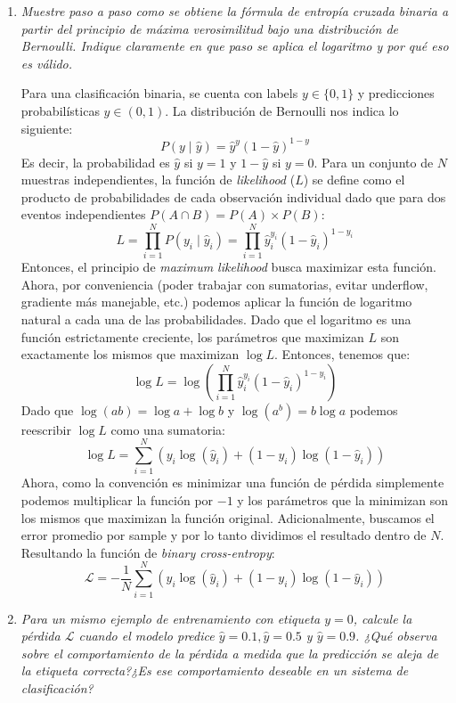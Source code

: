 \documentclass[11pt]{article}
\begin{document}
\begin{enumerate}[label=\alph*.]
  \item \textit{Muestre paso a paso como se obtiene la fórmula de entropía cruzada binaria a partir del principio de máxima verosimilitud bajo una distribución
    de Bernoulli. Indique claramente en que paso se aplica el logaritmo y por qué eso es válido.}

    Para una clasificación binaria, se cuenta con labels $y \in \{0,1\}$ y predicciones probabilísticas $\hat{y} \in (0,1)$. La distribución
    de Bernoulli nos indica lo siguiente:
    \[
      P(y \mid \hat{y}) = \hat{y}^{y} (1-\hat{y})^{1-y}
    \]
    Es decir, la probabilidad es $\hat{y}$ si $y = 1$ y $1 - \hat{y}$ si $y = 0$. Para un conjunto de $N$ muestras independientes, la función 
    de \textit{likelihood} ($L$) se define como el producto de probabilidades de cada observación individual dado que para dos eventos independientes
    $P(A \cap B) = P(A) \times P(B)$:
    \[
      L = \prod_{i=1}^{N} P(y_i \mid \hat{y}_i) = \prod_{i=1}^{N} \hat{y}_i^{y_i} (1 - \hat{y}_i)^{1 - y_i}
    \]
    Entonces, el principio de \textit{maximum likelihood} busca maximizar esta función. Ahora, por conveniencia (poder trabajar con sumatorias, evitar
    underflow, gradiente más manejable, etc.) podemos aplicar la función de logaritmo natural a cada una de las probabilidades. Dado que el logaritmo
    es una función estrictamente creciente, los parámetros que maximizan $L$ son exactamente los mismos que maximizan $\log L$. Entonces, tenemos que:
    \[
      \log L = \log{\left(\prod_{i=1}^{N} \hat{y}_i^{y_i} (1 - \hat{y}_i)^{1 - y_i}\right)}
    \]
    Dado que $\log (ab) = \log a + \log b$ y $\log(a^b) = b \log a$ podemos reescribir $\log L$ como una sumatoria:
    \[
      \log L = \sum_{i=1}^{N} (y_i \log{(\hat{y}_i)} + (1 - y_i) \log(1 - \hat{y}_i))
    \]
    Ahora, como la convención es minimizar una función de pérdida simplemente podemos multiplicar la función por $-1$ y los parámetros que la minimizan 
    son los mismos que maximizan la función original. Adicionalmente, buscamos el error promedio por sample y por lo tanto dividimos el resultado dentro
    de $N$. Resultando la función de \textit{binary cross-entropy}:
    \[
      \mathcal{L} = -\frac{1}{N}\sum_{i=1}^{N} (y_i \log{(\hat{y}_i)} + (1 - y_i) \log(1 - \hat{y}_i))
    \]


  \item \textit{Para un mismo ejemplo de entrenamiento con etiqueta $y=0$, calcule la pérdida $\mathcal{L}$ cuando el modelo predice
    $\hat{y} = 0.1, \hat{y} = 0.5$ y $\hat{y} = 0.9$. ¿Qué observa sobre el comportamiento de la pérdida a medida que la predicción
    se aleja de la etiqueta correcta?¿Es ese comportamiento deseable en un sistema de clasificación?}


\end{enumerate}
\end{document}
